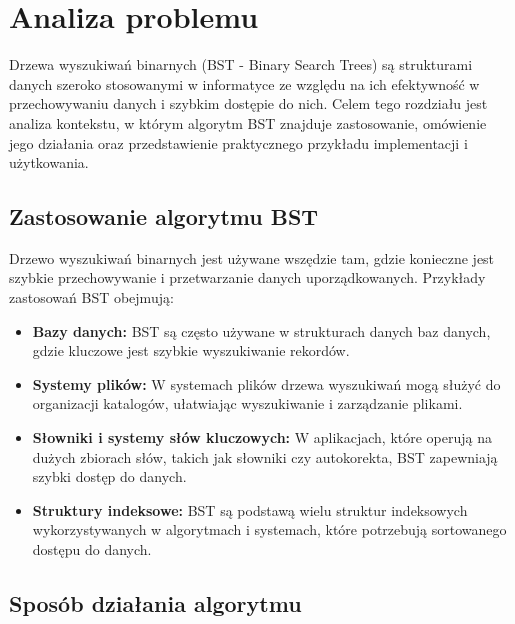 
\newpage
\section{Analiza problemu}

Drzewa wyszukiwań binarnych (BST - Binary Search Trees) są strukturami danych szeroko stosowanymi w informatyce ze względu na ich efektywność w przechowywaniu danych i szybkim dostępie do nich. Celem tego rozdziału jest analiza kontekstu, w którym algorytm BST znajduje zastosowanie, omówienie jego działania oraz przedstawienie praktycznego przykładu implementacji i użytkowania.

\subsection{Zastosowanie algorytmu BST}

Drzewo wyszukiwań binarnych jest używane wszędzie tam, gdzie konieczne jest szybkie przechowywanie i przetwarzanie danych uporządkowanych. Przykłady zastosowań BST obejmują:
\begin{itemize}
  \item \textbf{Bazy danych:} BST są często używane w strukturach danych baz danych, gdzie kluczowe jest szybkie wyszukiwanie rekordów.
  \item \textbf{Systemy plików:} W systemach plików drzewa wyszukiwań mogą służyć do organizacji katalogów, ułatwiając wyszukiwanie i zarządzanie plikami.
  \item \textbf{Słowniki i systemy słów kluczowych:} W aplikacjach, które operują na dużych zbiorach słów, takich jak słowniki czy autokorekta, BST zapewniają szybki dostęp do danych.
  \item \textbf{Struktury indeksowe:} BST są podstawą wielu struktur indeksowych wykorzystywanych w algorytmach i systemach, które potrzebują sortowanego dostępu do danych.
\end{itemize}

\subsection{Sposób działania algorytmu}

